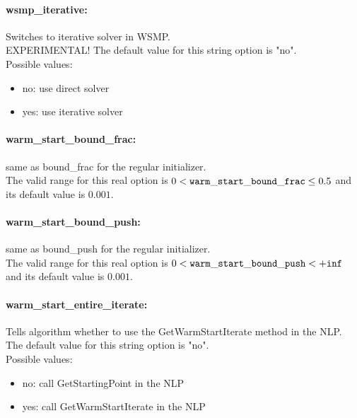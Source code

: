 \paragraph{wsmp\_iterative:}\label{sec:wsmp_iterative} Switches to iterative solver in WSMP. $\;$ \\
 EXPERIMENTAL!
The default value for this string option is "no".
\\ 
Possible values:
\begin{itemize}
   \item no: use direct solver
   \item yes: use iterative solver
\end{itemize}

\paragraph{warm\_start\_bound\_frac:}\label{sec:warm_start_bound_frac} same as bound\_frac for the regular initializer. $\;$ \\
 The valid range for this real option is 
$0 <  {\tt warm\_start\_bound\_frac } \le 0.5$
and its default value is $0.001$.


\paragraph{warm\_start\_bound\_push:}\label{sec:warm_start_bound_push} same as bound\_push for the regular initializer. $\;$ \\
 The valid range for this real option is 
$0 <  {\tt warm\_start\_bound\_push } <  {\tt +inf}$
and its default value is $0.001$.


\paragraph{warm\_start\_entire\_iterate:}\label{sec:warm_start_entire_iterate} Tells algorithm whether to use the GetWarmStartIterate method in the NLP. $\;$ \\

The default value for this string option is "no".
\\ 
Possible values:
\begin{itemize}
   \item no: call GetStartingPoint in the NLP
   \item yes: call GetWarmStartIterate in the NLP
\end{itemize}

